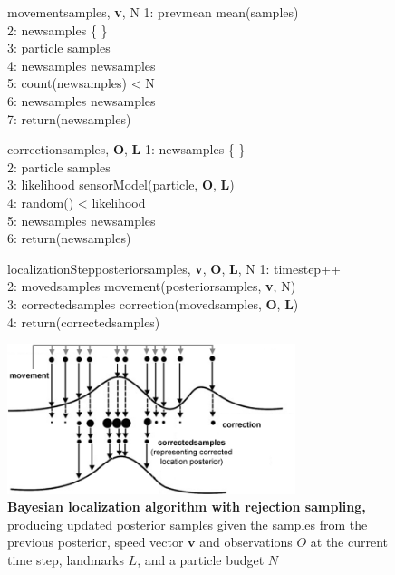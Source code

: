 \begin{figure}[h]
	\begin{pseudocode}{movement}{samples, \textbf{v}, N}
		1: prevmean \GETS mean(samples) \\
		2: newsamples \GETS \{ \} \\
		3: \FOREACH particle \in samples \\
		4: \quad newsamples \GETS newsamples  \\
		5: \WHILE count(newsamples) < N \\
		6: \quad newsamples \GETS newsamples  \\
		7: return(newsamples)
	\end{pseudocode}
	\begin{pseudocode}{correction}{samples, \textbf{O}, \textbf{L}}
		1: newsamples \GETS \{ \} \\
		2: \FOREACH particle \in samples \\
		3: \quad likelihood \GETS sensorModel(particle, \textbf{O}, \textbf{L}) \\
		4: \quad \IF random() < likelihood \\
		5: \quad \quad newsamples \GETS newsamples  \\
		6: return(newsamples)
	\end{pseudocode}
	\begin{pseudocode}{localizationStep}{posteriorsamples, \textbf{v}, \textbf{O}, \textbf{L}, N}
		1: timestep++ \\
		2: movedsamples \GETS movement(posteriorsamples, \textbf{v}, N) \\
		3: correctedsamples \GETS  correction(movedsamples, \textbf{O}, \textbf{L}) \\
		4: return(correctedsamples)
	\end{pseudocode}
	\centering
	\includegraphics[width=0.75\textwidth]{img/rejectionsampling}
	\caption[Bayesian localization algorithm with rejection sampling]{\textbf{Bayesian localization algorithm with rejection sampling,} producing updated posterior samples given the samples from the previous posterior, speed vector $\bm v$ and observations $O$ at the current time step, landmarks $L$, and a particle budget $N$}
	\label{fig:bayesloc}
\end{figure}

